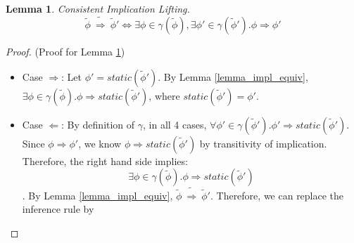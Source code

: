 \documentclass {article}
\newtheorem{lemma}[theorem]{Lemma}
\newcommand{\tphi}{\widetilde{\phi}}
\newcommand{\imp}{\Rightarrow}
\newcommand{\timp}{\ \widetilde{\Rightarrow}\ }
\begin{document}
\begin{lemma}
\label{lemma_impl_lift}
Consistent Implication Lifting.\\
$$\tphi \timp \tphi' \iff \exists \phi \in \gamma(\tphi), \exists \phi' \in \gamma(\tphi'). \phi \imp \phi'$$
\end{lemma}

\begin{proof} (Proof for Lemma \ref{lemma_impl_lift})
\begin{itemize}
	\item Case $\Rightarrow$: Let $\phi' = static(\tphi')$. By Lemma \ref{lemma_impl_equiv}, $\exists \phi \in \gamma(\tphi). \phi \imp static(\tphi')$, where $static(\tphi') = \phi'$. 
	\item Case $\Leftarrow$: By definition of $\gamma$, in all 4 cases, $\forall \phi' \in \gamma(\tphi').\phi' \imp static(\tphi')$. Since $\phi \imp \phi'$, we know $\phi \imp static(\tphi')$ by transitivity of implication. Therefore, the right hand side implies: $$\exists \phi \in \gamma(\tphi).\phi \imp static(\tphi')$$. By Lemma \ref{lemma_impl_equiv}, $\tphi \timp \tphi' $. Therefore, we can replace the inference rule by 
\end{itemize}

\end{proof}
\end{document}
